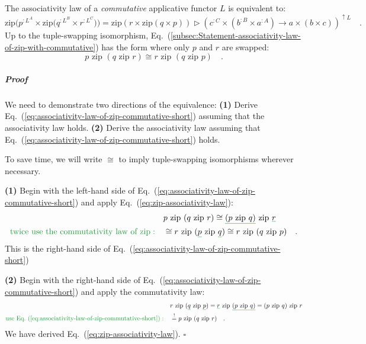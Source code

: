 The associativity law of a \emph{commutative} applicative functor
$L$ is equivalent to:
\begin{equation}
\text{zip}\big(p^{:L^{A}}\times\text{zip}\big(q^{:L^{B}}\times r^{:L^{C}}\big)\big)=\text{zip}\left(r\times\text{zip}\left(q\times p\right)\right)\triangleright(c^{:C}\times(b^{:B}\times a^{:A})\rightarrow a\times(b\times c))^{\uparrow L}\quad.\label{eq:associativity-law-of-zip-commutative}
\end{equation}
Up to the tuple-swapping isomorphism, Eq.~(\ref{subsec:Statement-associativity-law-of-zip-with-commutative})
has the form where only $p$ and $r$ are swapped:
\begin{equation}
p\,\,\text{zip}\,\,(q\,\,\text{zip}\,\,r)\cong r\,\,\text{zip}\,\,(q\,\,\text{zip}\,\,p)\quad.\label{eq:associativity-law-of-zip-commutative-short}
\end{equation}


\subparagraph{Proof}

We need to demonstrate two directions of the equivalence: \textbf{(1)}
Derive Eq.~(\ref{eq:associativity-law-of-zip-commutative-short})
assuming that the associativity law holds. \textbf{(2)} Derive the
associativity law assuming that Eq.~(\ref{eq:associativity-law-of-zip-commutative-short})
holds.

To save time, we will write $\cong$ to imply tuple-swapping isomorphisms
wherever necessary.

\textbf{(1)} Begin with the left-hand side of Eq.~(\ref{eq:associativity-law-of-zip-commutative-short})
and apply Eq.~(\ref{eq:zip-associativity-law}):
\begin{align*}
 & p\,\,\text{zip}\,\,(q\,\,\text{zip}\,\,r)\cong\gunderline{(p\,\,\text{zip}\,\,q)}\,\,\text{zip}\,\,\gunderline r\\
{\color{greenunder}\text{twice use the commutativity law of }\text{zip}:}\quad & \cong r\,\,\text{zip}\,\,(\gunderline p\,\,\text{zip}\,\,\gunderline q)\cong r\,\,\text{zip}\,\,(q\,\,\text{zip}\,\,p)\quad.
\end{align*}
This is the right-hand side of Eq.~(\ref{eq:associativity-law-of-zip-commutative-short})

\textbf{(2)} Begin with the right-hand side of Eq.~(\ref{eq:associativity-law-of-zip-commutative-short})
and apply the commutativity law:
\begin{align*}
 & r\,\,\text{zip}\,\,(\gunderline q\,\,\text{zip}\,\,\gunderline p)=\gunderline r\,\,\text{zip}\,\,\gunderline{(p\,\,\text{zip}\,\,q)}=(p\,\,\text{zip}\,\,q)\,\,\text{zip}\,\,r\\
{\color{greenunder}\text{use Eq.~(\ref{eq:associativity-law-of-zip-commutative-short})}:}\quad & \overset{!}{=}p\,\,\text{zip}\,\,(q\,\,\text{zip}\,\,r)\quad.
\end{align*}
We have derived Eq.~(\ref{eq:zip-associativity-law}). $\square$


